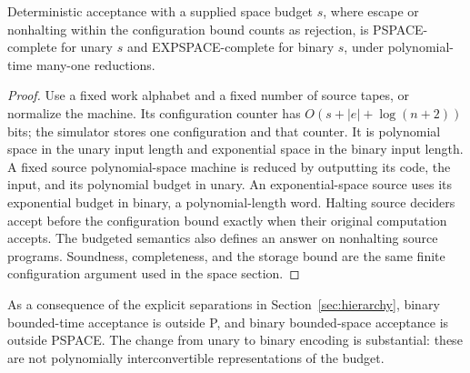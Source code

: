 \begin{theorem}\label{thm:C06}
Deterministic acceptance with a supplied space budget $s$, where escape or nonhalting within the configuration bound counts as rejection, is PSPACE-complete for unary $s$ and EXPSPACE-complete for binary $s$, under polynomial-time many-one reductions.
\end{theorem}
\begin{proof}
Use a fixed work alphabet and a fixed number of source tapes, or normalize the machine. Its configuration counter has $O(s+|e|+\log(n+2))$ bits; the simulator stores one configuration and that counter. It is polynomial space in the unary input length and exponential space in the binary input length. A fixed source polynomial-space machine is reduced by outputting its code, the input, and its polynomial budget in unary. An exponential-space source uses its exponential budget in binary, a polynomial-length word. Halting source deciders accept before the configuration bound exactly when their original computation accepts. The budgeted semantics also defines an answer on nonhalting source programs. Soundness, completeness, and the storage bound are the same finite configuration argument used in the space section.
\end{proof}

As a consequence of the explicit separations in Section~\ref{sec:hierarchy}, binary bounded-time acceptance is outside P, and binary bounded-space acceptance is outside PSPACE. The change from unary to binary encoding is substantial: these are not polynomially interconvertible representations of the budget.
